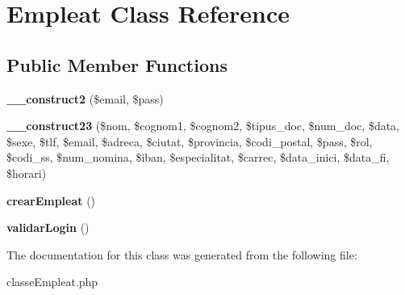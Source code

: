 \hypertarget{classEmpleat}{}\section{Empleat Class Reference}
\label{classEmpleat}
\subsection*{Public Member Functions}
\begin{DoxyCompactItemize}
\item 
{\bfseries \+\_\+\+\_\+construct2} (\$email, \$pass)\hypertarget{classEmpleat_a868bfa25d14fbf9872bbeecf5ad63a4b}{}\label{classEmpleat_a868bfa25d14fbf9872bbeecf5ad63a4b}

\item 
{\bfseries \+\_\+\+\_\+construct23} (\$nom, \$cognom1, \$cognom2, \$tipus\+\_\+doc, \$num\+\_\+doc, \$data, \$sexe, \$tlf, \$email, \$adreca, \$ciutat, \$provincia, \$codi\+\_\+postal, \$pass, \$rol, \$codi\+\_\+ss, \$num\+\_\+nomina, \$iban, \$especialitat, \$carrec, \$data\+\_\+inici, \$data\+\_\+fi, \$horari)\hypertarget{classEmpleat_a745116c6281e518b3cee18f290ea0a88}{}\label{classEmpleat_a745116c6281e518b3cee18f290ea0a88}

\item 
{\bfseries crear\+Empleat} ()\hypertarget{classEmpleat_aa9fab8be86c76a4a411b9cc5ef22e3df}{}\label{classEmpleat_aa9fab8be86c76a4a411b9cc5ef22e3df}

\item 
{\bfseries validar\+Login} ()\hypertarget{classEmpleat_a96dd81bf6586db6a600bd4dab6813503}{}\label{classEmpleat_a96dd81bf6586db6a600bd4dab6813503}

\end{DoxyCompactItemize}


The documentation for this class was generated from the following file\+:\begin{DoxyCompactItemize}
\item 
classe\+Empleat.\+php\end{DoxyCompactItemize}
